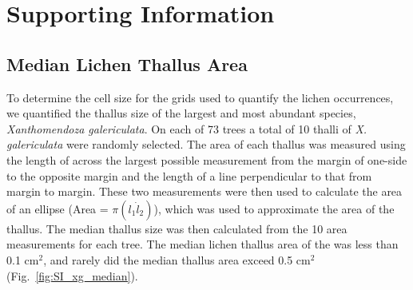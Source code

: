 \documentclass[11pt,onecolumn,lineno]{pnas-new}
\begin{document}
\section{Supporting Information}



\setcounter{figure}{0}
\setcounter{table}{0}

\subsection{Median Lichen Thallus Area}

To determine the cell size for the grids used to quantify the lichen
occurrences, we quantified the thallus size of the largest and most
abundant species, \textit{Xanthomendoza galericulata}. On each of 73
trees a total of 10 thalli of \textit{X. galericulata} were randomly
selected. The area of each thallus was measured using the length of
across the largest possible measurement from the margin of one-side to
the opposite margin and the length of a line perpendicular to that
from margin to margin. These two measurements were then used to
calculate the area of an ellipse (Area = $\pi (l_1 \dot l_2)$), which
was used to approximate the area of the thallus. The median thallus
size was then calculated from the 10 area measurements for each
tree. The median lichen thallus area of the was less than 0.1 cm$^2$,
and rarely did the median thallus area exceed 0.5 cm$^2$
(Fig.~\ref{fig:SI_xg_median}).
\end{document}
